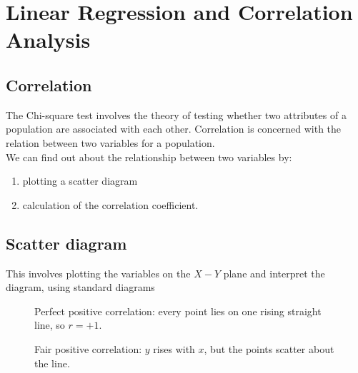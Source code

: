 \documentclass[11pt,a4paper]{article}
\theoremstyle{definition}
\begin{document}
\section{Linear Regression and Correlation Analysis}


\subsection{Correlation}
The Chi-square test involves the theory of testing whether two attributes of a population are associated with each other. Correlation is concerned with the relation between two variables for a population.\\ We can find out about the relationship between two variables by:
\begin{enumerate}
\item plotting a scatter diagram
\item calculation of the correlation coefficient.\\
\end{enumerate}




\subsection{Scatter diagram}
This involves plotting the variables on the $X-Y$ plane and interpret the diagram, using standard diagrams



\begin{figure}[H]
\centering
{}
\caption{Perfect positive correlation: every point lies on one rising straight line, so $r=+1$.}
\end{figure}









\begin{figure}[H]
\centering
{}
\caption{Fair positive correlation: $y$ rises with $x$, but the points scatter about the line.}
\end{figure}
\end{document}
